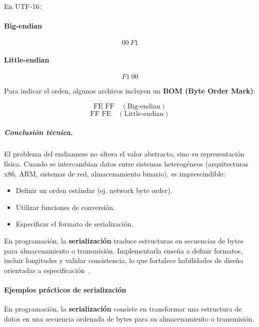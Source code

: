 \documentclass[12pt,twoside]{book}
\begin{document}
						En UTF-16:
						
						\paragraph{Big-endian}
						
						\[
						00\ F1
						\]
						
						\paragraph{Little-endian}
						
						\[
						F1\ 00
						\]
						
						Para indicar el orden, algunos archivos incluyen un \textbf{BOM (Byte Order Mark)}:
						
						\[
						\text{FE FF} \quad (\text{Big-endian})
						\]
						\[
						\text{FF FE} \quad (\text{Little-endian})
						\]
						
						
						\subparagraph{Conclusión técnica.} El problema del endianness no altera el valor abstracto, sino su representación física. Cuando se intercambian datos entre sistemas heterogéneos (arquitecturas x86, ARM, sistemas de red, almacenamiento binario), es imprescindible:
						
						\begin{itemize}
							\item Definir un orden estándar (ej. network byte order).
							\item Utilizar funciones de conversión.
							\item Especificar el formato de serialización.
						\end{itemize}
						
						\noindent
						En programación, la \textbf{serialización} traduce estructuras en secuencias de bytes para almacenamiento o transmisión. Implementarla enseña a definir formatos, incluir longitudes y validar consistencia, lo que fortalece habilidades de diseño orientadas a especificación~\cite{Hanly2015Problem,Gaddis2022Starting,ISO247722024Programming}.
						
						\paragraph{Ejemplos prácticos de serialización}
						
						En programación, la \textbf{serialización} consiste en transformar una estructura de datos en una secuencia ordenada de bytes para su almacenamiento o transmisión. 
						
\end{document}
